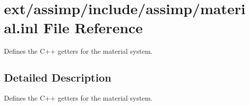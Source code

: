 \hypertarget{material_8inl}{\section{ext/assimp/include/assimp/material.inl File Reference}
\label{material_8inl}
}


Defines the C++ getters for the material system.  




\subsection{Detailed Description}
Defines the C++ getters for the material system. 